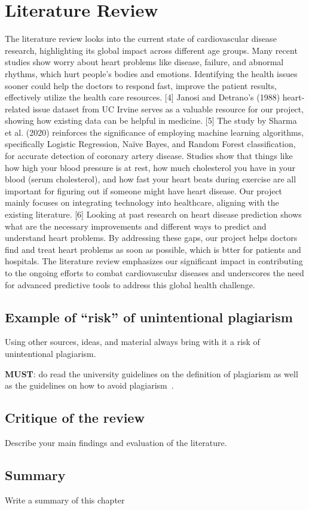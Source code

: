 \chapter{Literature Review}
\label{ch:lit_rev} %
The literature review looks into the current state of cardiovascular disease research, highlighting its global impact across different age groups. Many recent studies show worry about heart problems like disease, failure, and abnormal rhythms, which hurt people's bodies and emotions. Identifying the health issues sooner could help the doctors to respond fast, improve the patient results, effectively utilize the health care resources. [4] Janosi and Detrano's (1988) heart-related issue dataset from UC Irvine serves as a valuable resource for our project, showing how existing data can be helpful in medicine. [5] The study by Sharma et al. (2020) reinforces the significance of employing machine learning algorithms, specifically Logistic Regression, Naïve Bayes, and Random Forest classification, for accurate detection of coronary artery disease. Studies show that things like how high your blood pressure is at rest, how much cholesterol you have in your blood (serum cholesterol), and how fast your heart beats during exercise are all important for figuring out if someone might have heart disease. Our project mainly focuses on integrating technology into healthcare, aligning with the existing literature. [6] Looking at past research on heart disease prediction shows what are the necessary improvements and different ways to predict and understand heart problems. By addressing these gaps, our project helps doctors find and treat heart problems as soon as possible, which is btter for patients and hospitals. The literature review emphasizes our significant impact in contributing to the ongoing efforts to combat cardiovascular diseases and underscores the need for advanced predictive tools to address this global health challenge.

\section{Example of ``risk'' of unintentional plagiarism}
Using other sources, ideas, and material always bring with it a risk of unintentional plagiarism. 

\noindent
\textbf{\color{red}MUST}: do read the university guidelines on the definition of plagiarism as well as the guidelines on how to avoid plagiarism~\citep{uor_plagiarism}.




\section{Critique of the review} %
Describe your main findings and evaluation of the literature. ~\\

\section{Summary} 
Write a summary of this chapter~\\
